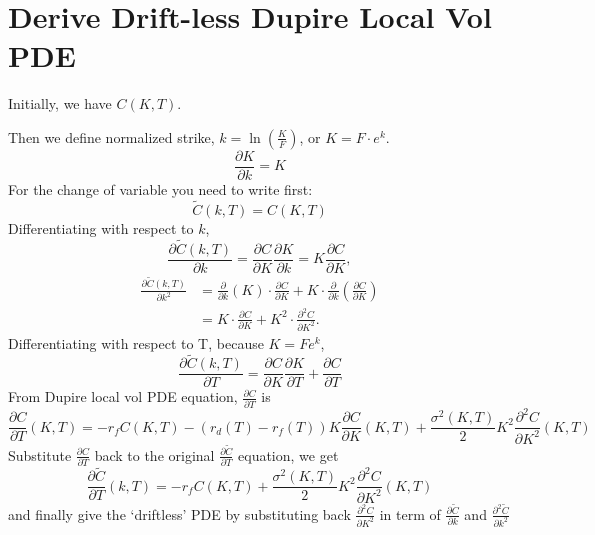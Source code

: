 \documentclass[12pt]{article}
\begin{document}
\section{Derive Drift-less Dupire Local Vol PDE}
Initially, we have $C(K,T)$. \par
Then we define normalized strike, $k=\ln(\frac{K}{F})$, or $K=F\cdot e^k$.
\begin{equation}
    \frac{\partial K}{\partial k}=K
\end{equation}
For the change of variable you need to write first:
\begin{equation}
    \tilde{C}(k,T)=C(K,T)
\end{equation}
Differentiating with respect to $k$,
\begin{equation}
    \frac{\partial \tilde{C}(k,T)}{\partial k}=\frac{\partial C}{\partial K}\frac{\partial K}{\partial k}=K\frac{\partial C}{\partial K},
\end{equation}
\begin{equation}
\begin{split}
    \frac{\partial \tilde{C}(k,T)}{\partial k^2}&=\frac{\partial}{\partial k}(K)\cdot\frac{\partial C}{\partial K}+K\cdot\frac{\partial}{\partial k}(\frac{\partial C}{\partial K}) \\
    &=K\cdot\frac{\partial C}{\partial K}+K^2\cdot\frac{\partial^2 C}{\partial K^2}.
\end{split}
\end{equation}
Differentiating with respect to T, because $K=Fe^k$,
\begin{equation}
    \frac{\partial \tilde{C}(k,T)}{\partial T}=\frac{\partial C}{\partial K}\frac{\partial K}{\partial T}+\frac{\partial C}{\partial T}
\end{equation}
From Dupire local vol PDE equation, $\frac{\partial C}{\partial T}$ is
\begin{equation}
    \frac{\partial C}{\partial T}(K,T)=-r_fC(K,T)-(r_d(T)-r_f(T))K\frac{\partial C}{\partial K}(K,T)+\frac{\sigma^2(K,T)}{2}K^2\frac{\partial^2C}{\partial K^2}(K,T)
\end{equation}
Substitute $\frac{\partial C}{\partial T}$ back to the original $\frac{\partial \tilde{C}}{\partial T}$ equation, we get 
\begin{equation}
    \frac{\partial \tilde{C}}{\partial T}(k,T)=-r_fC(K,T)+\frac{\sigma^2(K,T)}{2}K^2\frac{\partial^2C}{\partial K^2}(K,T)
\end{equation}
and finally give the `driftless' PDE by substituting back $\frac{\partial^2C}{\partial K^2}$ in term of $\frac{\partial \tilde{C}}{\partial k}$ and $\frac{\partial^2 \tilde{C}}{\partial k^2}$
\end{document}
